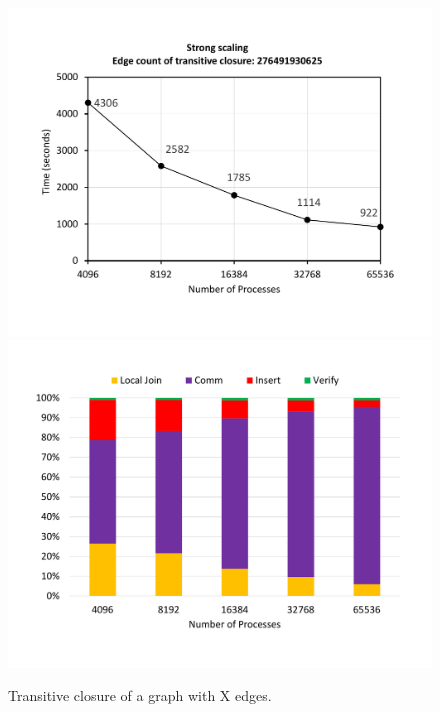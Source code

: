 \begin{figure}[t]
	{\includegraphics[width=.50\textwidth,  trim={0cm 0cm 0cm 0cm, 
			clip}]{results/TC_2_final.pdf}}\hfill%
	{\includegraphics[width=.50\textwidth,  trim={0cm 0cm 0cm 0cm,
			clip}]{results/TC_2_break_down_final.pdf}}\hfill%
	\centering
	\caption{Transitive closure of a graph with X edges.}
	\label{fig:tc_big}
\end{figure}



